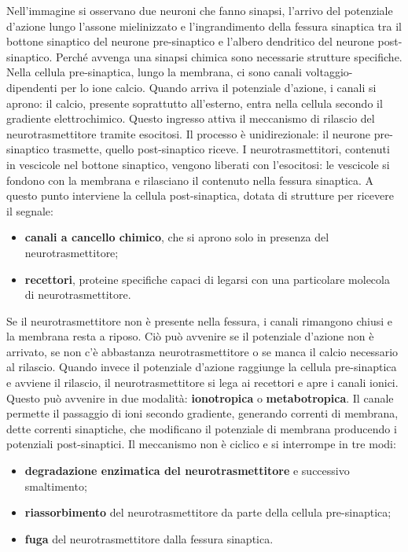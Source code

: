 \documentclass[12pt,a4paper,openany]{book}
\begin{document}
Nell’immagine si osservano due neuroni che fanno sinapsi, l’arrivo del potenziale d’azione lungo l’assone mielinizzato e l’ingrandimento della fessura sinaptica tra il bottone sinaptico del neurone pre-sinaptico e l’albero dendritico del neurone post-sinaptico. Perché avvenga una sinapsi chimica sono necessarie strutture specifiche. Nella cellula pre-sinaptica, lungo la membrana, ci sono canali voltaggio-dipendenti per lo ione calcio. Quando arriva il potenziale d’azione, i canali si aprono: il calcio, presente soprattutto all’esterno, entra nella cellula secondo il gradiente elettrochimico. Questo ingresso attiva il meccanismo di rilascio del neurotrasmettitore tramite esocitosi. Il processo è unidirezionale: il neurone pre-sinaptico trasmette, quello post-sinaptico riceve.
I neurotrasmettitori, contenuti in vescicole nel bottone sinaptico, vengono liberati con l’esocitosi: le vescicole si fondono con la membrana e rilasciano il contenuto nella fessura sinaptica. A questo punto interviene la cellula post-sinaptica, dotata di strutture per ricevere il segnale:
\begin{itemize}
    \item \textbf{canali a cancello chimico}, che si aprono solo in presenza del neurotrasmettitore;
    \item \textbf{recettori}, proteine specifiche capaci di legarsi con una particolare molecola di neurotrasmettitore.
\end{itemize}
Se il neurotrasmettitore non è presente nella fessura, i canali rimangono chiusi e la membrana resta a riposo. Ciò può avvenire se il potenziale d’azione non è arrivato, se non c’è abbastanza neurotrasmettitore o se manca il calcio necessario al rilascio. Quando invece il potenziale d’azione raggiunge la cellula pre-sinaptica e avviene il rilascio, il neurotrasmettitore si lega ai recettori e apre i canali ionici. Questo può avvenire in due modalità: \textbf{ionotropica} o \textbf{metabotropica}. Il canale permette il passaggio di ioni secondo gradiente, generando correnti di membrana, dette correnti sinaptiche, che modificano il potenziale di membrana producendo i potenziali post-sinaptici. Il meccanismo non è ciclico e si interrompe in tre modi:
\begin{itemize}
    \item \textbf{degradazione enzimatica del neurotrasmettitore} e successivo smaltimento;
    \item \textbf{riassorbimento} del neurotrasmettitore da parte della cellula pre-sinaptica;
    \item \textbf{fuga} del neurotrasmettitore dalla fessura sinaptica.
\end{itemize}
\end{document}
